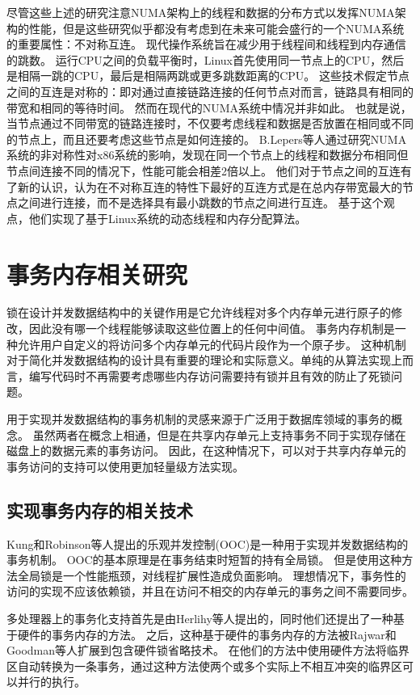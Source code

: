 尽管这些上述的研究注意NUMA架构上的线程和数据的分布方式以发挥NUMA架构的性能，但是这些研究似乎都没有考虑到在未来可能会盛行的一个NUMA系统的重要属性：不对称互连。
现代操作系统旨在减少用于线程间和线程到内存通信的跳数。
运行CPU之间的负载平衡时，Linux首先使用同一节点上的CPU，然后是相隔一跳的CPU，最后是相隔两跳或更多跳数距离的CPU。
这些技术假定节点之间的互连是对称的：即对通过直接链路连接的任何节点对而言，链路具有相同的带宽和相同的等待时间。
然而在现代的NUMA系统中情况并非如此。
也就是说，当节点通过不同带宽的链路连接时，不仅要考虑线程和数据是否放置在相同或不同的节点上，而且还要考虑这些节点是如何连接的。
B.Lepers\cite{lepers2015thread}等人通过研究NUMA系统的非对称性对x86系统的影响，发现在同一个节点上的线程和数据分布相同但节点间连接不同的情况下，性能可能会相差2倍以上。
他们对于节点之间的互连有了新的认识，认为在不对称互连的特性下最好的互连方式是在总内存带宽最大的节点之间进行连接，而不是选择具有最小跳数的节点之间进行互连。
基于这个观点，他们实现了基于Linux系统的动态线程和内存分配算法\cite{lepers2015thread}。


\section{事务内存相关研究}
锁在设计并发数据结构中的关键作用是它允许线程对多个内存单元进行原子的修改，因此没有哪一个线程能够读取这些位置上的任何中间值。
事务内存机制是一种允许用户自定义的将访问多个内存单元的代码片段作为一个原子步\cite{moir2004concurrent}。
这种机制对于简化并发数据结构的设计具有重要的理论和实际意义。单纯的从算法实现上而言，编写代码时不再需要考虑哪些内存访问需要持有锁并且有效的防止了死锁问题。

用于实现并发数据结构的事务机制的灵感来源于广泛用于数据库领域的事务的概念。
虽然两者在概念上相通，但是在共享内存单元上支持事务不同于实现存储在磁盘上的数据元素的事务访问。
因此，在这种情况下，可以对于共享内存单元的事务访问的支持可以使用更加轻量级方法实现。

\subsection{实现事务内存的相关技术}
Kung和Robinson等人提出的乐观并发控制(OOC)\cite{kung1981optimistic}是一种用于实现并发数据结构的事务机制。
OOC的基本原理是在事务结束时短暂的持有全局锁。
但是使用这种方法全局锁是一个性能瓶颈，对线程扩展性造成负面影响。
理想情况下，事务性的访问的实现不应该依赖锁，并且在访问不相交的内存单元的事务之间不需要同步。

多处理器上的事务化支持首先是由Herlihy等人\cite{herlihy1993transactional}提出的，同时他们还提出了一种基于硬件的事务内存的方法。
之后，这种基于硬件的事务内存的方法被Rajwar和Goodman等人扩展到包含硬件锁省略技术\cite{rajwar2001speculative,rajwar2002transactional}。
在他们的方法中使用硬件方法将临界区自动转换为一条事务，通过这种方法使两个或多个实际上不相互冲突的临界区可以并行的执行。

